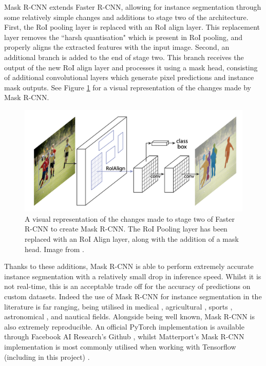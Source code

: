 Mask R-CNN extends Faster R-CNN, allowing for instance segmentation through some relatively simple changes and additions to stage two of the architecture. First, the RoI pooling layer is replaced with an RoI align layer. This replacement layer removes the ``harsh quantisation" which is present in RoI pooling, and properly aligns the extracted features with the input image. Second, an additional branch is added to the end of stage two. This branch receives the output of the new RoI align layer and processes it using a mask head, consisting of additional convolutional layers which generate pixel predictions and instance mask outputs. See Figure \ref{fig:mask-r-cnn-changes} for a visual representation of the changes made by Mask R-CNN.  

\begin{figure}
	\begin{center}
		\includegraphics[scale=0.3]{Chapter2/figs/mask-r-cnn-changes.png}
	\end{center}
	\caption{A visual representation of the changes made to stage two of Faster R-CNN to create Mask R-CNN. The RoI Pooling layer has been replaced with an RoI Align layer, along with the addition of a mask head. Image from \cite{he_mask_2017}.}
	\label{fig:mask-r-cnn-changes}
\end{figure}

Thanks to these additions, Mask R-CNN is able to perform extremely accurate instance segmentation with a relatively small drop in inference speed. Whilst it is not real-time, this is an acceptable trade off for the accuracy of predictions on custom datasets. Indeed the use of Mask R-CNN for instance segmentation in the literature is far ranging, being utilised in medical \cite{rohit_malhotra_autonomous_2018, chiao_detection_2019, liu_segmentation_2018, anantharaman_utilizing_2018}, agricultural \cite{qiao_cattle_2019, zhao_comparing_2018, lee_potato_2020, chu_deepapple_2020}, sports \cite{buric_ball_2018, pobar_detection_2019, nguyen_hand_2018}, astronomical \cite{burke_deblending_2019}, and nautical \cite{nie_inshore_2018, hong_trashcan_2020} fields. Alongside being well known, Mask R-CNN is also extremely reproducible. An official PyTorch implementation is available through Facebook AI Research's Github \cite{wu_detectron2_2020}, whilst Matterport's Mask R-CNN implementation is most commonly utilised when working with Tensorflow (including in this project) \cite{waleed_mask_2017}.


